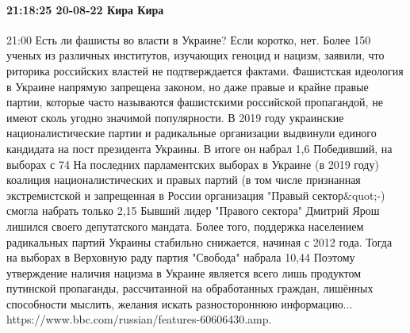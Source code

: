  
 
 
 
 

\paragraph{21:18:25 20-08-22 Кира Кира}

21:00
Есть ли фашисты во власти в Украине?
Если коротко, нет.
Более 150 ученых из различных институтов, изучающих геноцид и нацизм, заявили, что риторика российских властей не подтверждается фактами.
Фашистская идеология в Украине напрямую запрещена законом, но даже правые и крайне правые партии, которые часто называются фашистскими российской пропагандой, не имеют сколь угодно значимой популярности.
В 2019 году украинские националистические партии и радикальные организации выдвинули единого кандидата на пост президента Украины. В итоге он набрал 1,6%
Победивший, на выборах с 74%
На последних парламентских выборах в Украине (в 2019 году) коалиция националистических и правых партий (в том числе признанная экстремистской и запрещенная в России организация "Правый сектор&quot;-) смогла набрать только 2,15%
Бывший лидер "Правого сектора" Дмитрий Ярош лишился своего депутатского мандата.
Более того, поддержка населением радикальных партий Украины стабильно снижается, начиная с 2012 года. Тогда на выборах в Верховную раду партия "Свобода" набрала 10,44%
Поэтому утверждение наличия нацизма в Украине является всего лишь продуктом путинской пропаганды, рассчитанной на обработанных граждан, лишённых способности мыслить, желания искать разностороннюю информацию...
https://www.bbc.com/russian/features-60606430.amp.
